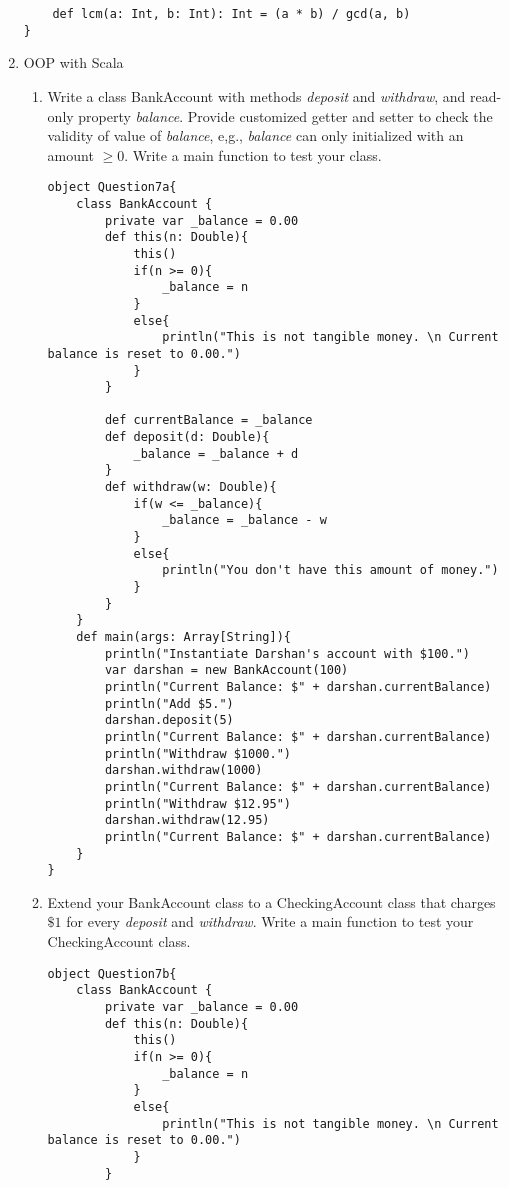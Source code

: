 \documentclass[11pt]{article}
\begin{document}
\begin{enumerate}
\begin{lstlisting}
	def lcm(a: Int, b: Int): Int = (a * b) / gcd(a, b)
}
\end{lstlisting}
\newpage
\item OOP with Scala \begin{enumerate} 
\item Write a class BankAccount with methods \textit{deposit} and \textit{withdraw}, and read-only property \textit{balance}. Provide customized getter and setter to check the validity of value of \textit{balance}, e,g., \textit{balance} can only initialized with an amount $\geq 0$. Write a main function to test your class. 
\begin{lstlisting}
object Question7a{
	class BankAccount {
		private var _balance = 0.00
		def this(n: Double){
			this()
			if(n >= 0){
				_balance = n
			}
			else{
				println("This is not tangible money. \n Current balance is reset to 0.00.")
			}
		}

		def currentBalance = _balance
		def deposit(d: Double){
			_balance = _balance + d
		}
		def withdraw(w: Double){
			if(w <= _balance){
				_balance = _balance - w
			}
			else{
				println("You don't have this amount of money.")
			}
		}
	}
	def main(args: Array[String]){
		println("Instantiate Darshan's account with $100.")
		var darshan = new BankAccount(100)
		println("Current Balance: $" + darshan.currentBalance)
		println("Add $5.")
		darshan.deposit(5)
		println("Current Balance: $" + darshan.currentBalance)
		println("Withdraw $1000.")
		darshan.withdraw(1000)
		println("Current Balance: $" + darshan.currentBalance)
		println("Withdraw $12.95")
		darshan.withdraw(12.95)
		println("Current Balance: $" + darshan.currentBalance)
	}
}
\end{lstlisting}
\newpage
\item Extend your BankAccount class to a CheckingAccount class that charges $\$1$ for every \textit{deposit} and \textit{withdraw}. Write a main function to test your CheckingAccount class. 
\begin{lstlisting}
object Question7b{
	class BankAccount {
		private var _balance = 0.00
		def this(n: Double){
			this()
			if(n >= 0){
				_balance = n
			}
			else{
				println("This is not tangible money. \n Current balance is reset to 0.00.")
			}
		}


\end{lstlisting}
\end{enumerate}
\end{enumerate}
\end{document}
